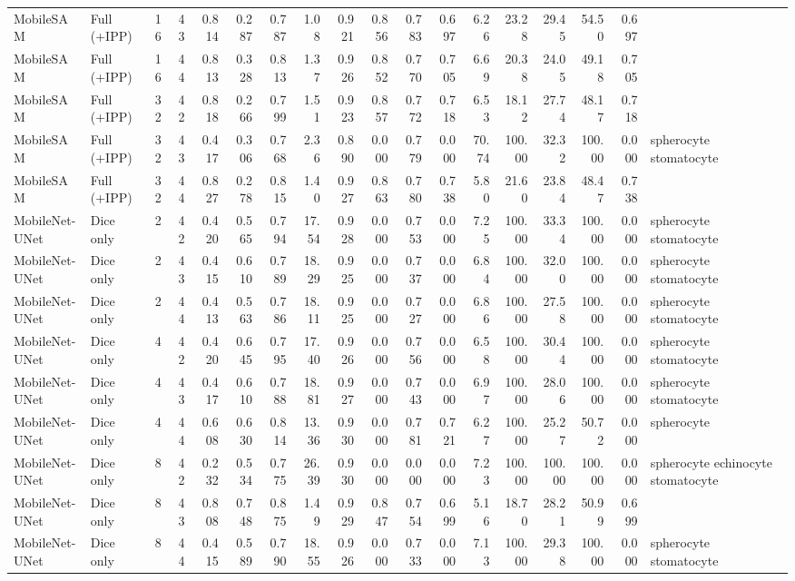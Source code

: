\documentclass[10pt]{article}
\begin{document}
\begin{landscape}
{\begin{longtable}{l l r r r r r r r r r r r r r r r l}
MobileSAM & Full (+IPP) & 16 & 43 & 0.814 & 0.287 & 0.787 & 1.08 & 0.921 & 0.856 & 0.783 & 0.697 & 6.26 & 23.28 & 29.45 & 54.50 & 0.697 &  \\
MobileSAM & Full (+IPP) & 16 & 44 & 0.813 & 0.328 & 0.813 & 1.37 & 0.926 & 0.852 & 0.770 & 0.705 & 6.69 & 20.38 & 24.05 & 49.18 & 0.705 &  \\
MobileSAM & Full (+IPP) & 32 & 42 & 0.818 & 0.266 & 0.799 & 1.51 & 0.923 & 0.857 & 0.772 & 0.718 & 6.53 & 18.12 & 27.74 & 48.17 & 0.718 &  \\
MobileSAM & Full (+IPP) & 32 & 43 & 0.417 & 0.306 & 0.768 & 2.36 & 0.890 & 0.000 & 0.779 & 0.000 & 70.74 & 100.00 & 32.32 & 100.00 & 0.000 & spherocyte stomatocyte \\
MobileSAM & Full (+IPP) & 32 & 44 & 0.827 & 0.278 & 0.815 & 1.40 & 0.927 & 0.863 & 0.780 & 0.738 & 5.80 & 21.60 & 23.84 & 48.47 & 0.738 &  \\
MobileNet-UNet & Dice only & 2 & 42 & 0.420 & 0.565 & 0.794 & 17.54 & 0.928 & 0.000 & 0.753 & 0.000 & 7.25 & 100.00 & 33.34 & 100.00 & 0.000 & spherocyte stomatocyte \\
MobileNet-UNet & Dice only & 2 & 43 & 0.415 & 0.610 & 0.789 & 18.29 & 0.925 & 0.000 & 0.737 & 0.000 & 6.84 & 100.00 & 32.00 & 100.00 & 0.000 & spherocyte stomatocyte \\
MobileNet-UNet & Dice only & 2 & 44 & 0.413 & 0.563 & 0.786 & 18.11 & 0.925 & 0.000 & 0.727 & 0.000 & 6.86 & 100.00 & 27.58 & 100.00 & 0.000 & spherocyte stomatocyte \\
MobileNet-UNet & Dice only & 4 & 42 & 0.420 & 0.645 & 0.795 & 17.40 & 0.926 & 0.000 & 0.756 & 0.000 & 6.58 & 100.00 & 30.44 & 100.00 & 0.000 & spherocyte stomatocyte \\
MobileNet-UNet & Dice only & 4 & 43 & 0.417 & 0.610 & 0.788 & 18.81 & 0.927 & 0.000 & 0.743 & 0.000 & 6.97 & 100.00 & 28.06 & 100.00 & 0.000 & spherocyte stomatocyte \\
MobileNet-UNet & Dice only & 4 & 44 & 0.608 & 0.630 & 0.814 & 13.36 & 0.930 & 0.000 & 0.781 & 0.721 & 6.27 & 100.00 & 25.27 & 50.72 & 0.000 & spherocyte \\
MobileNet-UNet & Dice only & 8 & 42 & 0.232 & 0.534 & 0.775 & 26.39 & 0.930 & 0.000 & 0.000 & 0.000 & 7.23 & 100.00 & 100.00 & 100.00 & 0.000 & spherocyte echinocyte stomatocyte \\
MobileNet-UNet & Dice only & 8 & 43 & 0.808 & 0.748 & 0.875 & 1.49 & 0.929 & 0.847 & 0.754 & 0.699 & 5.16 & 18.70 & 28.21 & 50.99 & 0.699 &  \\
MobileNet-UNet & Dice only & 8 & 44 & 0.415 & 0.589 & 0.790 & 18.55 & 0.926 & 0.000 & 0.733 & 0.000 & 7.13 & 100.00 & 29.38 & 100.00 & 0.000 & spherocyte stomatocyte \\

\end{longtable}}
\end{landscape}
\end{document}

